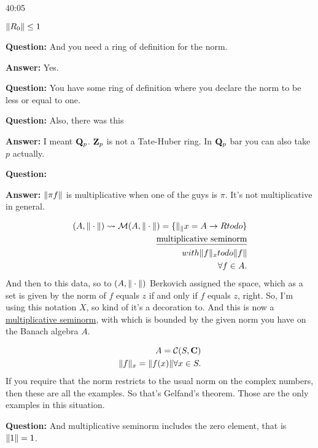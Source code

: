 \begin{example}
\begin{unfinished}{40:05}
\begin{example}
 $\| R_0 \| \leq 1$
\end{example}

\textbf{Question:} And you need a ring of definition for the norm. 

\textbf{Answer:} Yes.

\textbf{Question:} You have some ring of definition where you declare the norm to be less or equal to one.


\textbf{Question:} Also, there was this 

\textbf{Answer:} I meant $\mathbf Q_p$. $\mathbf Z_p$ is not a Tate-Huber ring. In $\mathbf Q_p$ bar  you can also take $p$ actually. 


\textbf{Question:} 

\textbf{Answer:} $\| \pi f \|$ is multiplicative when one of the guys is $\pi$. It's not multiplicative in general.


\begin{align*}
(A, \| \cdot \|) \leadsto \mathcal{M}(A, \| \cdot \|) = \{ \| _ \|{x} = A \to R todo \} \\
\text{\underline{multiplicative seminorm}} \\
with \| f \|_x todo \| f \| \\
\forall f \in A.
\end{align*}
And then to this data, so to $(A, \| \cdot \|)$ Berkovich assigned the space, which as a set is given by the norm of $f$ equals $z$ if and only if $f$ equals $z$, right.
So, I'm using this notation $X$, so kind of it's a decoration to. And this is now a \underline{multiplicative seminorm}, with which is bounded by the given norm you have on the Banach algebra $A$.

\begin{example} 
\begin{align*}
A = \mathcal{C}(S, \mathbf C) \\
\| f \|_x = \| f(x) \| \forall x \in S.
\end{align*}
If you require that the norm restricts to the usual norm on the complex numbers, then these are all the examples. So that's Gelfand's theorem. Those are the only examples in this situation. 

\textbf{Question:} And multiplicative seminorm includes the zero element, that is $\| 1 \| = 1$. 


\end{example}
\end{unfinished}
\end{example}
